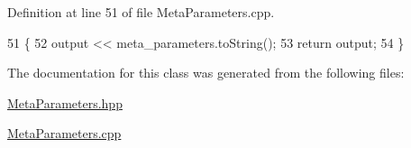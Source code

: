 Definition at line 51 of file Meta\+Parameters.\+cpp.


\begin{DoxyCode}
51                                                                                \{
52   output << meta\_parameters.toString();
53   \textcolor{keywordflow}{return} output;
54 \}
\end{DoxyCode}


The documentation for this class was generated from the following files\+:\begin{DoxyCompactItemize}
\item 
\hyperlink{MetaParameters_8hpp}{Meta\+Parameters.\+hpp}\item 
\hyperlink{MetaParameters_8cpp}{Meta\+Parameters.\+cpp}\end{DoxyCompactItemize}
